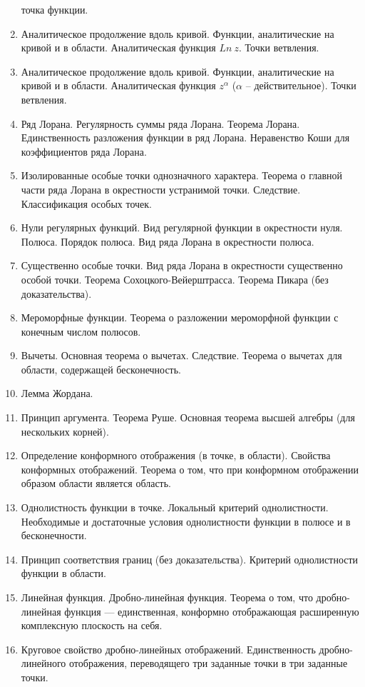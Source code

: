 \documentclass{article}
\begin{document}
\begin{enumerate}
	      точка функции.
	\item Аналитическое продолжение вдоль кривой. Функции, аналитические на кривой и в области. Аналитическая функция $Ln\ z$. Точки ветвления.
	\item Аналитическое продолжение вдоль кривой. Функции, аналитические на кривой и в области.
	      Аналитическая функция $z^\alpha$ ($\alpha$ – действительное). Точки ветвления.
	\item Ряд Лорана. Регулярность суммы ряда Лорана. Теорема Лорана. Единственность разложения функции в
	      ряд Лорана. Неравенство Коши для коэффициентов ряда Лорана.
	\item Изолированные особые точки однозначного характера. Теорема о главной части ряда Лорана в окрестности
	      устранимой точки. Следствие. Классификация особых точек.
	\item Нули регулярных функций. Вид регулярной функции в окрестности нуля. Полюса. Порядок полюса. Вид
	      ряда Лорана в окрестности полюса.
	\item Существенно особые точки. Вид ряда Лорана в окрестности существенно особой точки. Теорема Сохоцкого-Вейерштрасса. Теорема Пикара (без доказательства).
	\item Мероморфные функции. Теорема о разложении мероморфной функции с конечным числом полюсов.
	\item Вычеты. Основная теорема о вычетах. Следствие. Теорема о вычетах для области, содержащей бесконечность.
	\item Лемма Жордана.
	\item Принцип аргумента. Теорема Руше. Основная теорема высшей алгебры (для нескольких корней).
	\item Определение конформного отображения (в точке, в области). Свойства конформных отображений. Теорема
	      о том, что при конформном отображении образом области является область.
	\item Однолистность функции в точке. Локальный критерий однолистности. Необходимые и достаточные условия однолистности функции в полюсе и в бесконечности.
	\item Принцип соответствия границ (без доказательства). Критерий однолистности функции в области.
	\item Линейная функция. Дробно-линейная функция. Теорема о том, что дробно-линейная функция --- единственная, конформно отображающая расширенную комплексную плоскость на себя.
	\item Круговое свойство дробно-линейных отображений. Единственность дробно-линейного отображения, переводящего три заданные точки в три заданные точки.

\end{enumerate}
\end{document}
